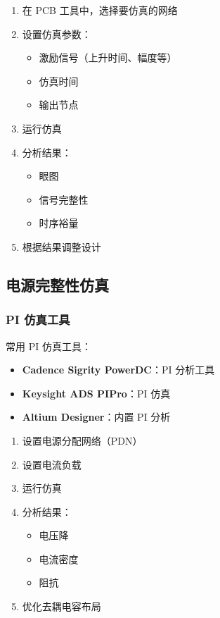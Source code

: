 
\begin{enumerate}
  \item 在 PCB 工具中，选择要仿真的网络
  \item 设置仿真参数：
    \begin{itemize}
      \item 激励信号（上升时间、幅度等）
      \item 仿真时间
      \item 输出节点
    \end{itemize}
  \item 运行仿真
  \item 分析结果：
    \begin{itemize}
      \item 眼图
      \item 信号完整性
      \item 时序裕量
    \end{itemize}
  \item 根据结果调整设计
\end{enumerate}

\subsection{电源完整性仿真}

\subsubsection{PI 仿真工具}

常用 PI 仿真工具：

\begin{itemize}
  \item \textbf{Cadence Sigrity PowerDC}：PI 分析工具
  \item \textbf{Keysight ADS PIPro}：PI 仿真
  \item \textbf{Altium Designer}：内置 PI 分析
\end{itemize}


\begin{enumerate}
  \item 设置电源分配网络（PDN）
  \item 设置电流负载
  \item 运行仿真
  \item 分析结果：
    \begin{itemize}
      \item 电压降
      \item 电流密度
      \item 阻抗
    \end{itemize}
  \item 优化去耦电容布局
\end{enumerate}

